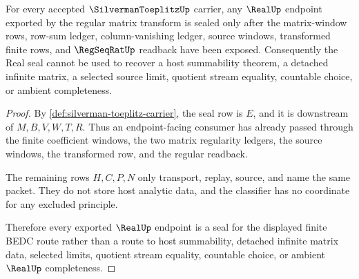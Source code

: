 \begin{theorem}\label{thm:silverman-toeplitz-real-seal-nonescape}
For every accepted $\SilvermanToeplitzUp$ carrier, any $\RealUp$ endpoint exported by the regular matrix transform is sealed only after the matrix-window rows, row-sum ledger, column-vanishing ledger, source windows, transformed finite rows, and $\RegSeqRatUp$ readback have been exposed. Consequently the Real seal cannot be used to recover a host summability theorem, a detached infinite matrix, a selected source limit, quotient stream equality, countable choice, or ambient completeness.
\end{theorem}
\begin{proof}
By \autoref{def:silverman-toeplitz-carrier}, the seal row is $E$, and it is downstream of $M,B,V,W,T,R$. Thus an endpoint-facing consumer has already passed through the finite coefficient windows, the two matrix regularity ledgers, the source windows, the transformed row, and the regular readback.

The remaining rows $H,C,P,N$ only transport, replay, source, and name the same packet. They do not store host analytic data, and the classifier has no coordinate for any excluded principle.

Therefore every exported $\RealUp$ endpoint is a seal for the displayed finite BEDC route rather than a route to host summability, detached infinite matrix data, selected limits, quotient stream equality, countable choice, or ambient $\RealUp$ completeness.
\end{proof}




